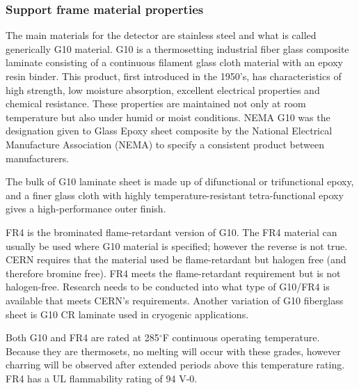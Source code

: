 \subsubsection{Support frame material properties}

The main materials for the detector are stainless steel and what is called generically G10 material.  G10 is a thermosetting industrial fiber glass composite laminate consisting of a continuous filament glass cloth material with an epoxy resin binder. This product, first introduced in the 1950's, has characteristics of high strength, low moisture absorption, excellent electrical properties  and chemical resistance. These properties are maintained not only at room temperature but also under humid or moist conditions. 
NEMA G10 was the designation given to Glass Epoxy sheet composite by the National Electrical Manufacture Association (NEMA) to specify a consistent product between manufacturers. 



The bulk of G10 laminate sheet is made up of difunctional or trifunctional epoxy, and a finer glass cloth with highly temperature-resistant tetra-functional epoxy gives a high-performance outer finish. 

FR4 is the brominated flame-retardant version of G10. The FR4 material can usually be used where G10 material is specified; however %
the reverse is not true. CERN requires that the material used be flame-retardant but halogen free (and therefore bromine free).  FR4 meets the flame-retardant requirement but %
is not halogen-free. Research needs to be conducted into what type of G10/FR4 is available that meets CERN's requirements.
Another variation of G10 fiberglass sheet is G10 CR laminate used in cryogenic applications. 

Both G10 and FR4 are rated at 285$^\circ$F continuous operating temperature. Because they are thermosets, no melting will occur with these grades, however charring will be observed after extended periods above this temperature rating. FR4 has a UL flammability rating of 94 V-0.

